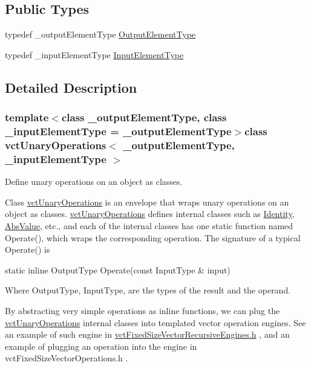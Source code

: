 \subsection*{Public Types}
\begin{DoxyCompactItemize}
\item 
typedef \+\_\+output\+Element\+Type \hyperlink{classvct_unary_operations_a42306ac3dd20d32c6d6c66ac3fa2e7b9}{Output\+Element\+Type}
\item 
typedef \+\_\+input\+Element\+Type \hyperlink{classvct_unary_operations_abf3b77bb7b8abd7ba72a6a45a65696a7}{Input\+Element\+Type}
\end{DoxyCompactItemize}


\subsection{Detailed Description}
\subsubsection*{template$<$class \+\_\+output\+Element\+Type, class \+\_\+input\+Element\+Type = \+\_\+output\+Element\+Type$>$class vct\+Unary\+Operations$<$ \+\_\+output\+Element\+Type, \+\_\+input\+Element\+Type $>$}

Define unary operations on an object as classes. 

Class \hyperlink{classvct_unary_operations}{vct\+Unary\+Operations} is an envelope that wraps unary operations on an object as classes. \hyperlink{classvct_unary_operations}{vct\+Unary\+Operations} defines internal classes such as \hyperlink{classvct_unary_operations_1_1_identity}{Identity}, \hyperlink{classvct_unary_operations_1_1_abs_value}{Abs\+Value}, etc., and each of the internal classes has one static function named Operate(), which wraps the corresponding operation. The signature of a typical Operate() is


\begin{DoxyPre} static inline OutputType Operate(const InputType & input)
\end{DoxyPre}


Where Output\+Type, Input\+Type, are the types of the result and the operand.

By abstracting very simple operations as inline functions, we can plug the \hyperlink{classvct_unary_operations}{vct\+Unary\+Operations} internal classes into templated vector operation engines. See an example of such engine in \hyperlink{vct_fixed_size_vector_recursive_engines_8h}{vct\+Fixed\+Size\+Vector\+Recursive\+Engines.\+h} , and an example of plugging an operation into the engine in vct\+Fixed\+Size\+Vector\+Operations.\+h .


